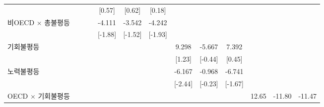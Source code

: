 \begin{table}[htbp]
{\begin{tabular}{l*{12}{c}}
                    &                     &                     &                     &      [0.57]         &      [0.62]         &      [0.18]         &                     &                     &                     &                     &                     &                     \\
\addlinespace
비OECD $\times$ 총불평등&                     &                     &                     &      -4.111\sym{*}  &      -3.542         &      -4.242\sym{*}  &                     &                     &                     &                     &                     &                     \\
                    &                     &                     &                     &     [-1.88]         &     [-1.52]         &     [-1.93]         &                     &                     &                     &                     &                     &                     \\
\addlinespace
기회불평등        &                     &                     &                     &                     &                     &                     &       9.298         &      -5.667         &       7.392         &                     &                     &                     \\
                    &                     &                     &                     &                     &                     &                     &      [1.23]         &     [-0.44]         &      [0.45]         &                     &                     &                     \\
\addlinespace
노력불평등        &                     &                     &                     &                     &                     &                     &      -6.167\sym{**} &      -0.968         &      -6.741\sym{*}  &                     &                     &                     \\
                    &                     &                     &                     &                     &                     &                     &     [-2.44]         &     [-0.23]         &     [-1.67]         &                     &                     &                     \\
\addlinespace
OECD $\times$ 기회불평등&                     &                     &                     &                     &                     &                     &                     &                     &                     &       12.65         &      -11.80         &      -11.47         \\

\end{tabular}}
\end{table}
